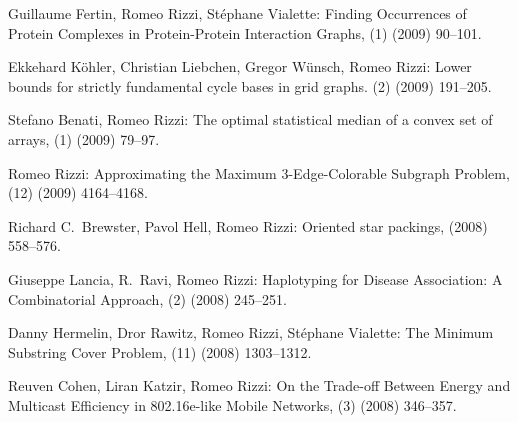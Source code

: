 \begin{etaremune}
  \item {\sc Guillaume Fertin, Romeo Rizzi, St\'ephane Vialette:}
   \newblock  Finding Occurrences of Protein
              Complexes in Protein-Protein Interaction Graphs,
   (1) (2009) 90--101.

  \item {\sc Ekkehard K\"ohler, Christian Liebchen, Gregor W\"unsch, Romeo Rizzi:}
   \newblock  Lower bounds for strictly fundamental cycle bases in grid graphs.    
   (2) (2009) 191--205.

  \item {\sc Stefano Benati, Romeo Rizzi:}
   \newblock   The optimal statistical median of a convex set of arrays,
   (1) (2009) 79--97.

  \item {\sc Romeo Rizzi:}
   \newblock   Approximating the Maximum $3$-Edge-Colorable Subgraph Problem,
   (12) (2009) 4164--4168.

  \item {\sc Richard C.~Brewster, Pavol Hell, Romeo Rizzi:}
   \newblock  Oriented star packings,
    (2008) 558--576.

  \item {\sc Giuseppe Lancia, R.~Ravi, Romeo Rizzi:}
   \newblock  Haplotyping for Disease Association: A Combinatorial Approach, 
   (2) (2008) 245--251.

  \item {\sc Danny Hermelin, Dror Rawitz, Romeo Rizzi, St\'ephane Vialette:}
   \newblock  The Minimum Substring Cover Problem,
   (11) (2008) 1303--1312.

  \item {\sc Reuven Cohen, Liran Katzir, Romeo Rizzi:}
   \newblock   On the Trade-off Between Energy and Multicast Efficiency in 802.16e-like Mobile Networks,
   (3) (2008) 346--357.


\end{etaremune}
